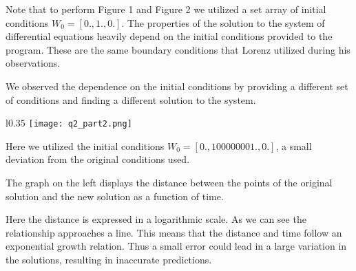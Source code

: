 \documentclass{article}
\begin{document}
Note that to perform Figure 1 and Figure 2 we utilized a set array of initial conditions  $W_0=[0., 1., 0.]$. The properties of the solution to the system of differential equations heavily depend on the initial conditions provided to the program. These are the same boundary conditions that Lorenz utilized during his observations.

We observed the dependence on the initial conditions by providing a different set of conditions and finding a different solution to the system.

\begin{wrapfigure}{l}{0.35\textwidth} %
    \centering
    \texttt{[image: q2\_part2.png]}
\end{wrapfigure}

Here we utilized the initial conditions $W_0=[0., 100000001., 0.]$, a small deviation from the original conditions used.

The graph on the left displays the distance between the points of the original solution and the new solution as a function of time.

Here the distance is expressed in a logarithmic scale. As we can see the relationship approaches a line. This means that the distance and time follow an exponential growth relation. Thus a small error could lead in a large variation in the solutions, resulting in inaccurate predictions.
\end{document}
